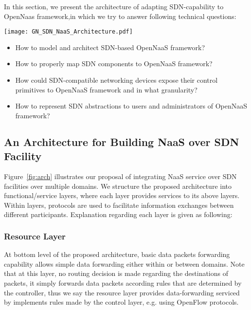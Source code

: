 \label{architecture}
In this section, we present the architecture of adapting SDN-capability to
OpenNaas framework,in which we try to answer following technical questions:

\begin{figure*}[ht]
	\centering
		\texttt{[image: GN\_SDN\_NaaS\_Architecture.pdf]}
	\caption{Architecture of Inter-domain NaaS Service over SDN Facilities}
	\label{fig:arch}
\end{figure*}

\begin{itemize}
	
	\item How to model and architect SDN-based OpenNaaS framework? 
	\item How to properly map SDN components to OpenNaaS framework?
	\item How could SDN-compatible networking devices expose their control primitives to
OpenNaaS framework and in what granularity?
	\item How to represent SDN abstractions to users and administrators of OpenNaaS framework? 

\end{itemize}

\subsection{An Architecture for Building NaaS over SDN Facility}

Figure~\ref{fig:arch} illustrates our proposal of integrating NaaS service over
SDN facilities over multiple domains. We structure the proposed architecture
into functional/service layers, where each layer provides services to its above
layers. Within layers, protocols are used to facilitate information exchanges
between different participants. Explanation regarding each layer is given as
following:

\subsubsection{Resource Layer} At bottom level of the proposed architecture,
basic data packets forwarding  capability allows simple data forwarding either
within or between domains. Note that at this layer, no routing decision is made
regarding the destinations of packets, it simply forwards data packets
according rules that are determined by the controller, thus we say the resource
layer provides data-forwarding serviced by implements rules made by the control
layer, e.g. using OpenFlow protocols. 

